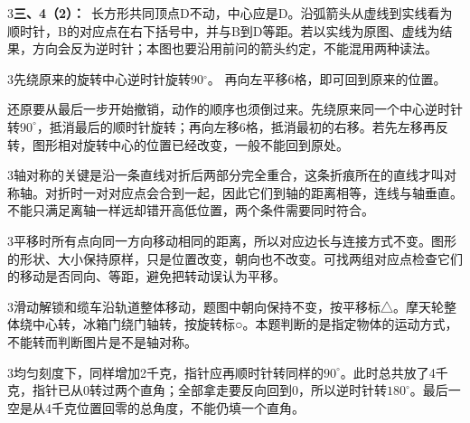 \documentclass[multi=snippet,border={5bp 20bp 5bp 5bp}]{standalone}
\newenvironment{snippet}[3]{\begin{minipage}{#1bp}\color{answerred}\fontsize{#2}{#3}\selectfont\raggedright}{\end{minipage}}
\begin{document}
\begin{snippet}{505}{11.5}{14}\begin{multicols}{3}\raggedcolumns \textbf{三、4（2）：}\ 长方形共同顶点D不动，中心应是D。沿弧箭头从虚线到实线看为顺时针，B的对应点在右下括号中，并与B到D等距。若以实线为原图、虚线为结果，方向会反为逆时针；本图也要沿用前问的箭头约定，不能混用两种读法。\end{multicols}\end{snippet}
\begin{snippet}{505}{11.5}{14}\begin{multicols}{3}\raggedcolumns 先绕原来的旋转中心逆时针旋转90\ensuremath{^\circ}。 再向左平移6格，即可回到原来的位置。\par 还原要从最后一步开始撤销，动作的顺序也须倒过来。先绕原来同一个中心逆时针转\(90^\circ\)\allowbreak ，抵消最后的顺时针旋转；再向左移6格，抵消最初的右移。若先左移再反转，图形相对旋转中心的位置已经改变，一般不能回到原处。\end{multicols}\end{snippet}
\begin{snippet}{505}{11.5}{14}\begin{multicols}{3}\raggedcolumns 轴对称的关键是沿一条直线对折后两部分完全重合，这条折痕所在的直线才叫对称轴。对折时一对对应点会合到一起，因此它们到轴的距离相等，连线与轴垂直。不能只满足离轴一样远却错开高低位置，两个条件需要同时符合。\end{multicols}\end{snippet}
\begin{snippet}{505}{11.5}{14}\begin{multicols}{3}\raggedcolumns 平移时所有点向同一方向移动相同的距离，所以对应边长与连接方式不变。图形的形状、大小保持原样，只是位置改变，朝向也不改变。可找两组对应点检查它们的移动是否同向、等距，避免把转动误认为平移。\end{multicols}\end{snippet}
\begin{snippet}{505}{11.5}{14}\begin{multicols}{3}\raggedcolumns 滑动解锁和缆车沿轨道整体移动，题图中朝向保持不变，按平移标△。摩天轮整体绕中心转，冰箱门绕门轴转，按旋转标○。本题判断的是指定物体的运动方式，不能转而判断图片是不是轴对称。\end{multicols}\end{snippet}
\begin{snippet}{505}{11.5}{14}\begin{multicols}{3}\raggedcolumns 均匀刻度下，同样增加2千克，指针应再顺时针转同样的\(90^\circ\)\allowbreak 。此时总共放了4千克，指针已从0转过两个直角；全部拿走要反向回到0，所以逆时针转\(180^\circ\)\allowbreak 。最后一空是从4千克位置回零的总角度，不能仍填一个直角。\end{multicols}\end{snippet}
\end{document}
